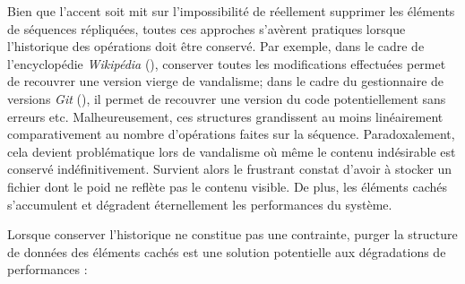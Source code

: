Bien que l'accent soit mit sur l'impossibilité de réellement supprimer les
éléments de séquences répliquées, toutes ces approches s'avèrent pratiques
lorsque l'historique des opérations doit être conservé. Par exemple, dans le
cadre de l'encyclopédie \emph{Wikipédia} (\REF), conserver toutes les
modifications effectuées permet de recouvrer une version vierge de vandalisme;
dans le cadre du gestionnaire de versions \emph{Git} (\REF), il permet de
recouvrer une version du code potentiellement sans erreurs etc. Malheureusement,
ces structures grandissent au moins linéairement comparativement au nombre
d'opérations faites sur la séquence. Paradoxalement, cela devient problématique
lors de vandalisme où même le contenu indésirable est conservé
indéfinitivement. Survient alors le frustrant constat d'avoir à stocker un
fichier dont le poid ne reflète pas le contenu visible. De plus, les éléments
cachés s'accumulent et dégradent éternellement les performances du système.

Lorsque conserver l'historique ne constitue pas une contrainte, purger la
structure de données des éléments cachés est une solution potentielle aux
dégradations de performances :


